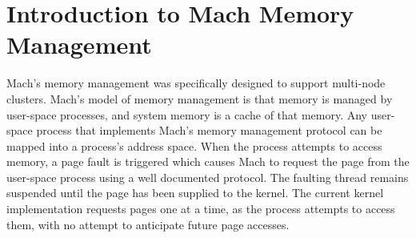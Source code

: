 \documentclass{article}
\begin{document}
\vfill\eject
\section{Introduction to Mach Memory Management}

Mach's memory management was specifically designed to support
multi-node clusters.  Mach's model of memory management is that memory
is managed by user-space processes, and system memory is a cache of
that memory.  Any user-space process that implements Mach's memory
management protocol can be mapped into a process's address space.
When the process attempts to access memory, a page fault is triggered
which causes Mach to request the page from the user-space process
using a well documented protocol.  The faulting thread remains
suspended until the page has been supplied to the kernel.
The current kernel implementation requests pages one at
a time, as the process attempts to access them, with no attempt
to anticipate future page accesses.
\end{document}
